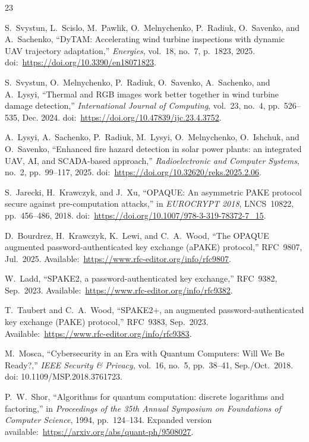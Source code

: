 \documentclass[conference]{IEEEtran}
\begin{document}
\clearpage
\onecolumn
\begin{thebibliography}{23}

S.~Svystun, L.~Scislo, M.~Pawlik, O.~Melnychenko, P.~Radiuk, O.~Savenko, and A.~Sachenko, ``DyTAM: Accelerating wind turbine inspections with dynamic UAV trajectory adaptation,'' \emph{Energies}, vol.~18, no.~7, p.~1823, 2025. doi:~\url{https://doi.org/10.3390/en18071823}.

S.~Svystun, O.~Melnychenko, P.~Radiuk, O.~Savenko, A.~Sachenko, and A.~Lysyi, ``Thermal and RGB images work better together in wind turbine damage detection,'' \emph{International Journal of Computing}, vol.~23, no.~4, pp.~526--535, Dec. 2024. doi:~\url{https://doi.org/10.47839/ijc.23.4.3752}.

A.~Lysyi, A.~Sachenko, P.~Radiuk, M.~Lysyi, O.~Melnychenko, O.~Ishchuk, and O.~Savenko, ``Enhanced fire hazard detection in solar power plants: an integrated UAV, AI, and SCADA-based approach,'' \emph{Radioelectronic and Computer Systems}, no.~2, pp.~99--117, 2025. doi:~\url{https://doi.org/10.32620/reks.2025.2.06}.

S.~Jarecki, H.~Krawczyk, and J.~Xu, ``OPAQUE: An asymmetric PAKE protocol secure against pre-computation attacks,'' in \emph{EUROCRYPT 2018}, LNCS~10822, pp.~456--486, 2018. doi:~\url{https://doi.org/10.1007/978-3-319-78372-7_15}.

D.~Bourdrez, H.~Krawczyk, K.~Lewi, and C.~A.~Wood, ``The OPAQUE augmented password-authenticated key exchange (aPAKE) protocol,'' RFC~9807, Jul.~2025. Available:~\url{https://www.rfc-editor.org/info/rfc9807}.

W.~Ladd, ``SPAKE2, a password-authenticated key exchange,'' RFC~9382, Sep.~2023. Available:~\url{https://www.rfc-editor.org/info/rfc9382}.

T.~Taubert and C.~A.~Wood, ``SPAKE2+, an augmented password-authenticated key exchange (PAKE) protocol,'' RFC~9383, Sep.~2023. Available:~\url{https://www.rfc-editor.org/info/rfc9383}.

M.~Mosca, ``Cybersecurity in an Era with Quantum Computers: Will We Be Ready?,'' \emph{IEEE Security \& Privacy}, vol.~16, no.~5, pp.~38--41, Sep./Oct.~2018. doi: 10.1109/MSP.2018.3761723.

P.~W.~Shor, ``Algorithms for quantum computation: discrete logarithms and factoring,'' in \emph{Proceedings of the 35th Annual Symposium on Foundations of Computer Science}, 1994, pp.~124--134. Expanded version available:~\url{https://arxiv.org/abs/quant-ph/9508027}.


\end{thebibliography}
\end{document}
